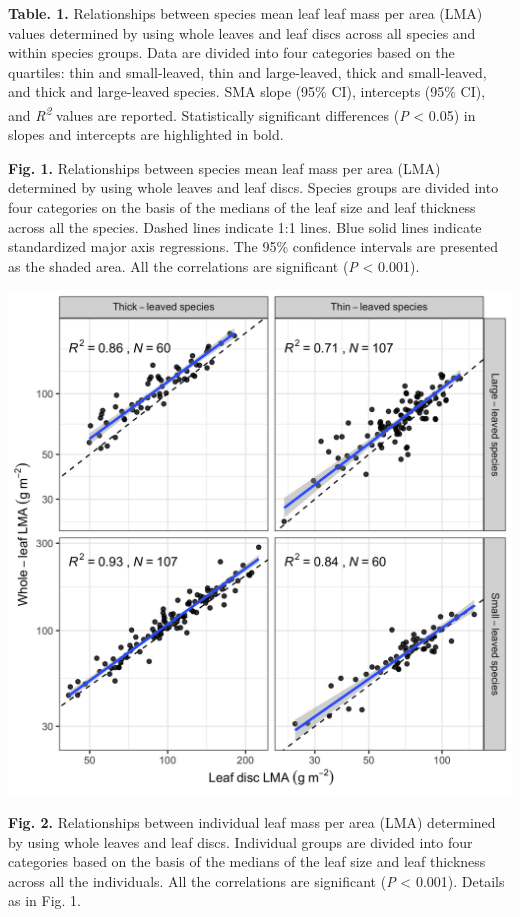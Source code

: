 \documentclass[
  12pt,
  a4paper,
,tablecaptionabove
]{scrartcl}
\begin{document}
\textbf{Table. 1.} Relationships between species mean leaf leaf mass per
area (LMA) values determined by using whole leaves and leaf discs across
all species and within species groups. Data are divided into four
categories based on the quartiles: thin and small-leaved, thin and
large-leaved, thick and small-leaved, and thick and large-leaved
species. SMA slope (95\% CI), intercepts (95\% CI), and
\emph{R\textsuperscript{2}} values are reported. Statistically
significant differences (\emph{P} \textless{} 0.05) in slopes and
intercepts are highlighted in bold.

\newpage

\textbf{Fig. 1.} Relationships between species mean leaf mass per area
(LMA) determined by using whole leaves and leaf discs. Species groups
are divided into four categories on the basis of the medians of the leaf
size and leaf thickness across all the species. Dashed lines indicate
1:1 lines. Blue solid lines indicate standardized major axis
regressions. The 95\% confidence intervals are presented as the shaded
area. All the correlations are significant (\emph{P} \textless{} 0.001).

\includegraphics{../figs/LMA_sp_gr.png}

\newpage

\textbf{Fig. 2.} Relationships between individual leaf mass per area
(LMA) determined by using whole leaves and leaf discs. Individual groups
are divided into four categories based on the basis of the medians of
the leaf size and leaf thickness across all the individuals. All the
correlations are significant (\emph{P} \textless{} 0.001). Details as in
Fig. 1.
\end{document}
